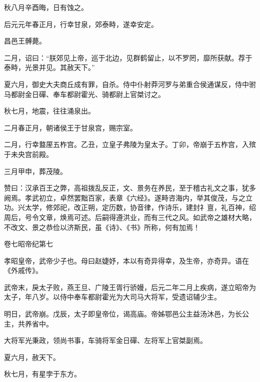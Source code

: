 \documentclass[12pt,UTF8]{ctexbook}
\begin{document}
秋八月辛酉晦，日有蚀之。



后元元年春正月，行幸甘泉，郊泰畤，遂幸安定。



昌邑王髆薨。



二月，诏曰：“朕郊见上帝，巡于北边，见群鹤留止，以不罗罔，靡所获献。荐于泰畤，光景并见。其赦天下。”



夏六月，御史大夫商丘成有罪，自杀。侍中仆射莽河罗与弟重合侯通谋反，侍中驸马都尉金日磾、奉车都尉霍光、骑都尉上官桀讨之。



秋七月，地震，往往涌泉出。



二月春正月，朝诸侯王于甘泉宫，赐宗室。



二月，行幸盩厔五柞宫。乙丑，立皇子弗陵为皇太子。丁卯，帝崩于五柞宫，入殡于未央宫前殿。



三月甲申，葬茂陵。



赞曰：汉承百王之弊，高祖拨乱反正，文、景务在养民，至于稽古礼文之事，犹多阙焉。孝武初立，卓然罢黜百家，表章《六经》。遂畤咨海内，举其俊茂，与之立功。兴太学，修郊祀，改正朔，定历数，协音律，作诗乐，建封礻亶，礼百神，绍周后，号令文章，焕焉可述。后嗣得遵洪业，而有三代之风。如武帝之雄材大略，不改文、景之恭俭以济斯民，虽《诗》、《书》所称，何有加焉！





卷七昭帝纪第七



孝昭皇帝，武帝少子也。母曰赵婕妤，本以有奇异得幸，及生帝，亦奇异。语在《外戚传》。



武帝末，戾太子败，燕王旦、广陵王胥行骄嫚，后元二年二月上疾病，遂立昭帝为太子，年八岁。以侍中奉车都尉霍光为大司马大将军，受遗诏辅少主。



明日，武帝崩。戊辰，太子即皇帝位，谒高庙。帝姊鄂邑公主益汤沐邑，为长公主，共养省中。



大将军光秉政，领尚书事，车骑将军金日磾、左将军上官桀副焉。



夏六月，赦天下。



秋七月，有星孛于东方。
\end{document}
